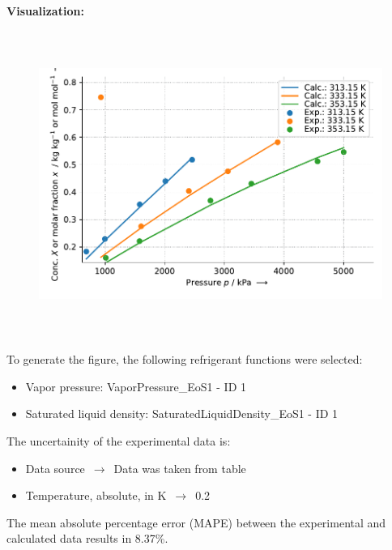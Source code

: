 \textbf{Visualization:}
%
\begin{figure}[!htp]
{\noindent\includegraphics[height=10cm, keepaspectratio]{figs/abs/abs_R-32_lubricant_BAB32_MixingRule_1.pdf}}
\end{figure}
%

To generate the figure, the following refrigerant functions were selected:
\begin{itemize}
\item Vapor pressure: VaporPressure\_EoS1 - ID 1
\item Saturated liquid density: SaturatedLiquidDensity\_EoS1 - ID 1
\end{itemize}

The uncertainity of the experimental data is:
\begin{itemize}
\item Data source $\,\to\,$ Data was taken from table
\item Temperature, absolute, in $\si{\kelvin}$ $\,\to\,$ 0.2
\end{itemize}

The mean absolute percentage error (MAPE) between the experimental and calculated data results in 8.37\%.
\FloatBarrier
\newpage
